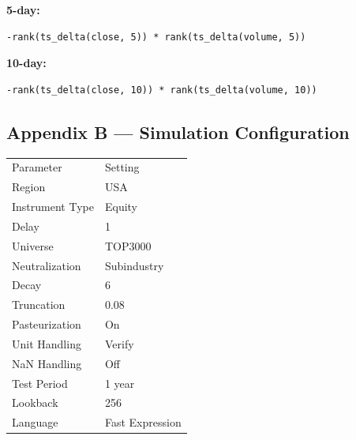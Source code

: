 \documentclass{article}
\begin{document}
\textbf{5-day:}

\begin{verbatim}
-rank(ts_delta(close, 5)) * rank(ts_delta(volume, 5))
\end{verbatim}

\textbf{10-day:}

\begin{verbatim}
-rank(ts_delta(close, 10)) * rank(ts_delta(volume, 10))
\end{verbatim}

\subsection{Appendix B — Simulation Configuration}

\begin{table}
\centering

\begin{tabular}{l l}
Parameter & Setting \\

Region & USA \\
Instrument Type & Equity \\
Delay & 1 \\
Universe & TOP3000 \\
Neutralization & Subindustry \\
Decay & 6 \\
Truncation & 0.08 \\
Pasteurization & On \\
Unit Handling & Verify \\
NaN Handling & Off \\
Test Period & 1 year \\
Lookback & 256 \\
Language & Fast Expression \\

\end{tabular}

\end{table}

 
\end{document}
